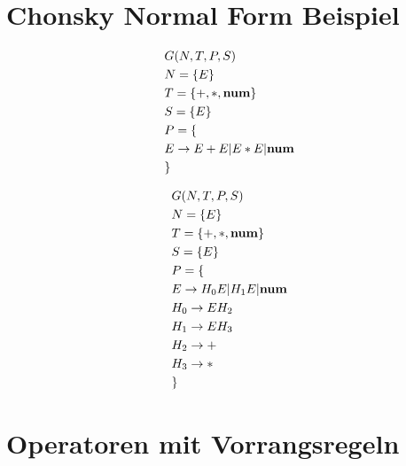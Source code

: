\documentclass[t]{beamer}
\begin{document}
    \section{Chonsky Normal Form Beispiel}
    \begin{frame}
        \begin{minipage}[c]{0.5\textwidth}
            \begin{align*}
                & G(N,T,P,S) \\
                & N= \{E\} \\
                & T= \{+, *, \bold{num}\} \\
                & S= \{E\}  \\
                & P = \{ \\
                & E \rightarrow E + E | E * E | \bold{num} \\
                & \}
            \end{align*}
        \end{minipage}\begin{minipage}[c]{0.5\textwidth}
                          \begin{align*}
                              & G(N,T,P,S) \\
                              & N= \{E\} \\
                              & T= \{+, *, \bold{num}\} \\
                              & S= \{E\}  \\
                              & P = \{ \\
                              & E \rightarrow H_0 E | H_1 E | \bold{num} \\
                              & H_0 \rightarrow E H_2 \\
                              & H_1 \rightarrow E H_3 \\
                              & H_2 \rightarrow + \\
                              & H_3 \rightarrow * \\
                              & \}
                          \end{align*}
        \end{minipage}
    \end{frame}


    \section{Operatoren mit Vorrangsregeln}
    \begin{frame}

    \end{frame}
\end{document}
